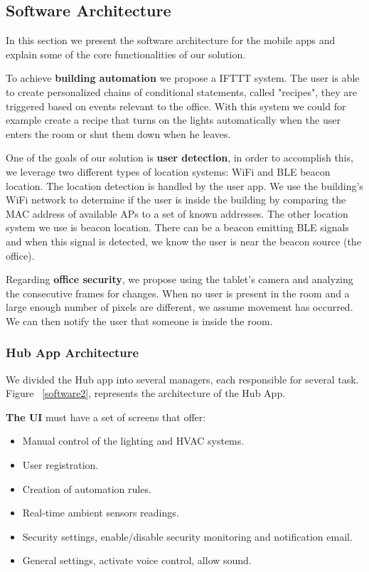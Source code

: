\documentclass[conference]{IEEEtran}
\begin{document}
\subsection{Software Architecture}\label{architecture4} 

In this section we present the software architecture for the mobile apps and explain some of the core functionalities of our solution.

To achieve \textbf{building automation} we propose a \ac{IFTTT} system. The user is able to create personalized chains of conditional statements, called "recipes", they are triggered based on events relevant to the office. With this system we could for example create a recipe that turns on the lights automatically when the user enters the room or shut them down when he leaves.

One of the goals of our solution is \textbf{user detection}, in order to accomplish this, we leverage two different types of location systems: \ac{WiFi} and \ac{BLE} beacon location. The location detection is handled by the user app. We use the building's \ac{WiFi} network to determine if the user is inside the building by comparing the \ac{MAC} address of available \ac{AP}s to a set of known addresses. The other location system we use is beacon location. There can be a beacon emitting \ac{BLE} signals and when this signal is detected, we know the user is near the beacon source (the office).

Regarding \textbf{office security}, we propose using the tablet's camera and analyzing the consecutive frames for changes. When no user is present in the room and a large enough number of pixels are different, we assume movement has occurred. We can then notify the user that someone is inside the room.


\subsubsection{Hub App Architecture}

We divided the Hub app into several managers, each responsible for several task. Figure~ \ref{software2}, represents the architecture of the Hub App.

\textbf{The \ac{UI}} must have a set of screens that offer:

\begin{itemize}
  \item Manual control of the lighting and HVAC systems.
  \item User registration.
  \item Creation of automation rules.
  \item Real-time ambient sensors readings.
  \item Security settings, enable/disable security monitoring and notification email.
  \item General settings, activate voice control, allow sound.
   
\end{itemize}
\end{document}
